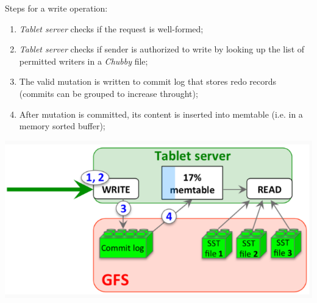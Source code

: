 \bigskip\noindent\begin{minipage}[c]{0.65\textwidth}
    Steps for a write operation:
    \begin{enumerate}
        \item \emph{Tablet server} checks if the request is well-formed;
        \item \emph{Tablet server} checks if sender is authorized to write by
        looking up the list of permitted writers in a \emph{Chubby} file;
        \item The valid mutation is written to commit log that stores redo
        records (commits can be grouped to increase throught);
        \item After mutation is committed, its content is inserted into
        memtable (i.e. in a memory sorted buffer);
    \end{enumerate}
\end{minipage}\hfill
\begin{minipage}[c]{0.33\textwidth}
    \includegraphics[width=\textwidth]{images/gbt-tablet-write.png}
\end{minipage}

